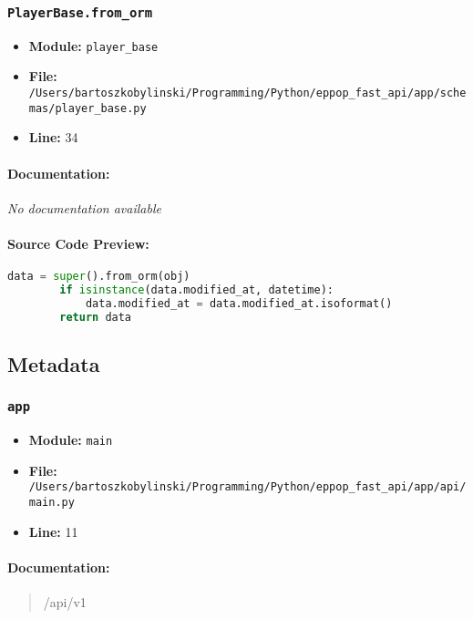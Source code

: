 \documentclass[11pt,a4paper]{article}
\begin{document}
\subsubsection{\texttt{PlayerBase.from\_orm}}

\begin{itemize}
    \item \textbf{Module:} \texttt{player\_base}
    \item \textbf{File:} \texttt{/Users/bartoszkobylinski/Programming/Python/eppop\_fast\_api/app/schemas/player\_base.py}
    \item \textbf{Line:} 34
\end{itemize}

\paragraph{Documentation:} \textit{No documentation available}

\paragraph{Source Code Preview:}
\begin{lstlisting}[language=Python]
        data = super().from_orm(obj)
        if isinstance(data.modified_at, datetime):
            data.modified_at = data.modified_at.isoformat()
        return data
\end{lstlisting}

\vspace{1em}
\subsection{Metadata}

\subsubsection{\texttt{app}}

\begin{itemize}
    \item \textbf{Module:} \texttt{main}
    \item \textbf{File:} \texttt{/Users/bartoszkobylinski/Programming/Python/eppop\_fast\_api/app/api/main.py}
    \item \textbf{Line:} 11
\end{itemize}

\paragraph{Documentation:}
\begin{quote}
/api/v1
\end{quote}
\end{document}
